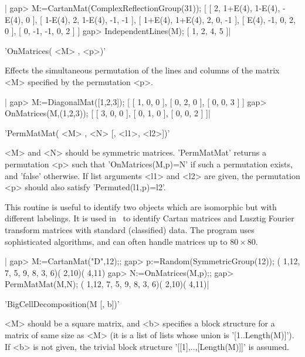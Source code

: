 |    gap> M:=CartanMat(ComplexReflectionGroup(31));
    [ [ 2, 1+E(4), 1-E(4), -E(4), 0 ], [ 1-E(4), 2, 1-E(4), -1, -1 ],
      [ 1+E(4), 1+E(4), 2, 0, -1 ], [ E(4), -1, 0, 2, 0 ],
      [ 0, -1, -1, 0, 2 ] ]
    gap> IndependentLines(M);
    [ 1, 2, 4, 5 ]|

%
%

'OnMatrices( <M> , <p>)'

Effects the simultaneous permutation of the lines and columns of the matrix
<M> specified by the permutation <p>.

|    gap> M:=DiagonalMat([1,2,3]);
    [ [ 1, 0, 0 ], [ 0, 2, 0 ], [ 0, 0, 3 ] ]
    gap> OnMatrices(M,(1,2,3));
    [ [ 3, 0, 0 ], [ 0, 1, 0 ], [ 0, 0, 2 ] ]|

%
%

'PermMatMat( <M> , <N> [, <l1>, <l2>])'

<M>  and  <N>  should  be  symmetric  matrices.  'PermMatMat'  returns a
permutation  <p>  such  that  'OnMatrices(M,p)=N'  if such a permutation
exists,  and  'false'  otherwise.  If  list  arguments <l1> and <l2> are
given, the permutation <p> should also satisfy 'Permuted(l1,p)=l2'.

This  routine is useful to identify two objects which are isomorphic but
with  different labelings.  It is  used in  \CHEVIE\ to  identify Cartan
matrices   and   Lusztig   Fourier   transform  matrices  with  standard
(classified)  data. The  program uses  sophisticated algorithms, and can
often handle matrices up to $80\times 80$.

|    gap> M:=CartanMat("D",12);;
    gap> p:=Random(SymmetricGroup(12));
    ( 1,12, 7, 5, 9, 8, 3, 6)( 2,10)( 4,11)
    gap> N:=OnMatrices(M,p);;
    gap> PermMatMat(M,N);
    ( 1,12, 7, 5, 9, 8, 3, 6)( 2,10)( 4,11)|

%
%

'BigCellDecomposition(M [, b])'

<M>  should be a square  matrix, and <b> specifies  a block structure for a
matrix  of  same  size  as  <M>  (it  is  a  list  of  lists whose union is
'[1..Length(M)]').  If  <b>  is  not  given,  the  trivial  block structure
'[[1],..,[Length(M)]]' is assumed.

